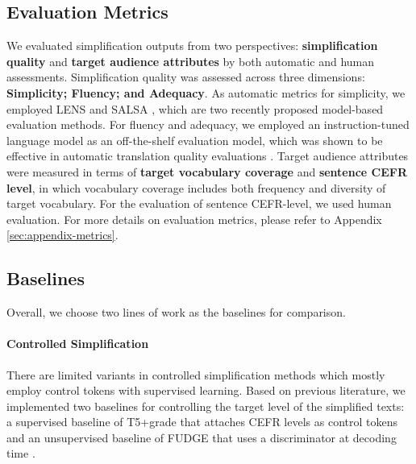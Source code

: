 \subsection{Evaluation Metrics}
We evaluated simplification outputs from two perspectives: \textbf{simplification quality} and \textbf{target audience attributes} by both automatic and human assessments. 
Simplification quality was assessed across three dimensions: \textbf{Simplicity; Fluency; and Adequacy}.         
As automatic metrics for simplicity, we employed LENS \cite{maddela-etal-2023-lens} and SALSA \cite{heineman-etal-2023-dancing}, which are two recently proposed model-based evaluation methods. 
For fluency and adequacy, we employed an instruction-tuned language model as an off-the-shelf evaluation model, which was shown to be effective in automatic translation quality evaluations \cite{kocmi-federmann-2023-large}. 
Target audience attributes were measured in terms of \textbf{target vocabulary coverage} and \textbf{sentence CEFR level},
in which vocabulary coverage includes both frequency and diversity of target vocabulary. 
For the evaluation of sentence CEFR-level, we used human evaluation. 
For more details on evaluation metrics, please refer to Appendix \ref{sec:appendix-metrics}.




\subsection{Baselines}
Overall, we choose two lines of work as the baselines for comparison.  

\paragraph{Controlled Simplification}
There are limited variants in controlled simplification methods which mostly employ control tokens with supervised learning. 
Based on previous literature, we implemented two baselines for controlling the target level of the simplified texts: a supervised baseline of T5+grade \cite{scarton-specia-2018-learning} that attaches CEFR levels as control tokens and an unsupervised baseline of FUDGE that uses a discriminator at decoding time \cite{yang-klein-2021-fudge}.


